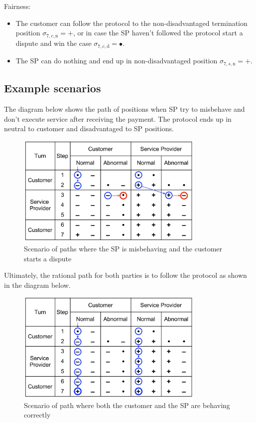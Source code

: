 \documentclass{ieeeaccess}
\begin{document}
Fairness:

\begin{itemize}

\item
  The customer can follow the protocol to the non-disadvantaged
  termination position \(\sigma_{7, c, \mathrm{n}} = +\), or in case the
  SP haven't followed the protocol start a dispute and win the case
  \(\sigma_{7, c, \overline{\mathrm{d}}} = •\).
\item
  The SP can do nothing and end up in non-disadvantaged position
  \(\sigma_{7, s, \mathrm{n}} = +\).
\end{itemize}

\subsection{Example scenarios}\label{example-scenarios}

The diagram below shows the path of positions when SP try to misbehave
and don't execute service after receiving the payment. The protocol ends
up in neutral to customer and disadvantaged to SP positions.

\begin{figure}[h!]
\includegraphics[width=9cm]{formal-misbehaviour-path.png}
\centering
\caption{Scenario of paths where the SP is misbehaving and the customer starts a dispute}
\label{fig:misbehaviour}
\end{figure}

Ultimately, the rational path for both parties is to follow the protocol
as shown in the diagram below.

\begin{figure}[h!]
\includegraphics[width=9cm]{formal-rational-path.png}
\centering
\caption{Scenario of path where both the customer and  the SP are behaving correctly}
\label{fig:well-behaviour}
\end{figure}
\end{document}
